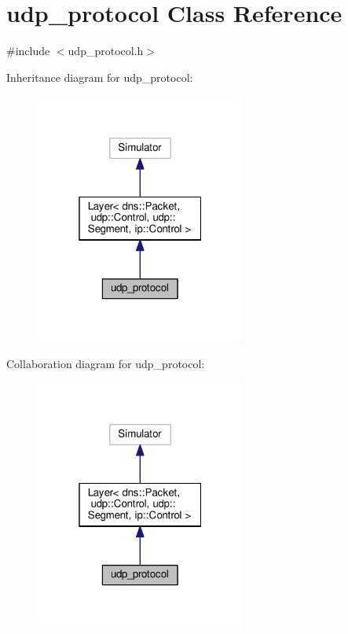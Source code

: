 \hypertarget{classudp__protocol}{}\section{udp\+\_\+protocol Class Reference}
\label{classudp__protocol}


{\ttfamily \#include $<$udp\+\_\+protocol.\+h$>$}



Inheritance diagram for udp\+\_\+protocol\+:\nopagebreak
\begin{figure}[H]
\begin{center}
\leavevmode
\includegraphics[width=196pt]{classudp__protocol__inherit__graph}
\end{center}
\end{figure}


Collaboration diagram for udp\+\_\+protocol\+:\nopagebreak
\begin{figure}[H]
\begin{center}
\leavevmode
\includegraphics[width=196pt]{classudp__protocol__coll__graph}
\end{center}
\end{figure}
